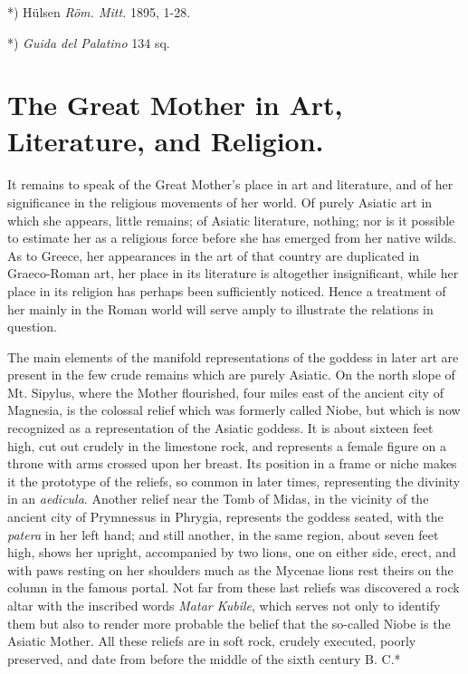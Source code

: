 \documentclass[a4paper, 11pt, oneside, polutonikogreek, english]{article}
\begin{document}
*) Hülsen \emph{Röm. Mitt.} 1895, 1-28.

*) \emph{Guida del Palatino} 134 sq.

\section{The Great Mother in Art, Literature, and Religion.}
\paragraph{}
It remains to speak of the Great Mother's place in art and literature, and of her significance in the religious movements of her world. Of purely Asiatic art in which she appears, little remains; of Asiatic literature, nothing; nor is it possible to estimate her as a religious force before she has emerged from her native wilds. As to Greece, her appearances in the art of that country are duplicated in Graeco-Roman art, her place in its literature is altogether insignificant, while her place in its religion has perhaps been sufficiently noticed. Hence a treatment of her mainly in the Roman world will serve amply to illustrate the relations in question.

The main elements of the manifold representations of the goddess in later art are present in the few crude remains which are purely Asiatic. On the north slope of Mt. Sipylus, where the Mother flourished, four miles east of the ancient city of Magnesia, is the colossal relief which was formerly called Niobe, but which is now recognized as a representation of the Asiatic goddess. It is about sixteen feet high, cut out crudely in the limestone rock, and represents a female figure on a throne with arms crossed upon her breast. Its position in a frame or niche makes it the prototype of the reliefs, so common in later times, representing the divinity in an \emph{aedicula}. Another relief near the Tomb of Midas, in the vicinity of the ancient city of Prymnessus in Phrygia, represents the goddess seated, with the \emph{patera} in her left hand; and still another, in the same region, about seven feet high, shows her upright, accompanied by two lions, one on either side, erect, and with paws resting on her shoulders much as the Mycenae lions rest theirs on the column in the famous portal. Not far from these last reliefs was discovered a rock altar with the inscribed words \emph{Matar Kubile}, which serves not only to identify them but also to render more probable the belief that the so-called Niobe is the Asiatic Mother. All these reliefs are in soft rock, crudely executed, poorly preserved, and date from before the middle of the sixth century B. C.*
\end{document}
